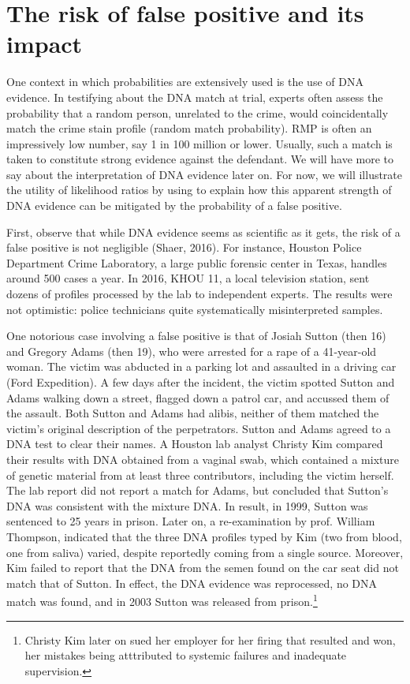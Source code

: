\documentclass[10pt,dvipsnames,enabledeprecatedfontcommands]{scrartcl}
\begin{document}
\section{\texorpdfstring{The risk of false positive and its impact
\label{sec:fp}}{The risk of false positive and its impact }}\label{the-risk-of-false-positive-and-its-impact}

One context in which probabilities are extensively used is the use of
DNA evidence. In testifying about the DNA match at trial, experts often
assess the probability that a random person, unrelated to the crime,
would coincidentally match the crime stain profile (random match
probability). RMP is often an impressively low number, say 1 in 100
million or lower. Usually, such a match is taken to constitute strong
evidence against the defendant. We will have more to say about the
interpretation of DNA evidence later on.  For now, we
will illustrate the utility of likelihood ratios by using to explain how
this apparent strength of DNA evidence can be mitigated by the
probability of a false positive.

First, observe that while DNA evidence seems as scientific as it gets,
the risk of a false positive is not negligible (Shaer, 2016). For
instance, Houston Police Department Crime Laboratory, a large public
forensic center in Texas, handles around 500 cases a year. In 2016, KHOU
11, a local television station, sent dozens of profiles processed by the
lab to independent experts. The results were not optimistic: police
technicians quite systematically misinterpreted samples.

One notorious case involving a false positive is that of Josiah Sutton
(then 16) and Gregory Adams (then 19), who were arrested for a rape of a
41-year-old woman. The victim was abducted in a parking lot and
assaulted in a driving car (Ford Expedition). A few days after the
incident, the victim spotted Sutton and Adams walking down a street,
flagged down a patrol car, and accussed them of the assault. Both Sutton
and Adams had alibis, neither of them matched the victim's original
description of the perpetrators. Sutton and Adams agreed to a DNA test
to clear their names. A Houston lab analyst Christy Kim compared their
results with DNA obtained from a vaginal swab, which contained a mixture
of genetic material from at least three contributors, including the
victim herself. The lab report did not report a match for Adams, but
concluded that Sutton's DNA was consistent with the mixture DNA. In
result, in 1999, Sutton was sentenced to 25 years in prison. Later on, a
re-examination by prof. William Thompson, indicated that the three DNA
profiles typed by Kim (two from blood, one from saliva) varied, despite
reportedly coming from a single source. Moreover, Kim failed to report
that the DNA from the semen found on the car seat did not match that of
Sutton. In effect, the DNA evidence was reprocessed, no DNA match was
found, and in 2003 Sutton was released from prison.\footnote{Christy Kim
  later on sued her employer for her firing that resulted and won, her
  mistakes being atttributed to systemic failures and inadequate
  supervision.}
\end{document}
